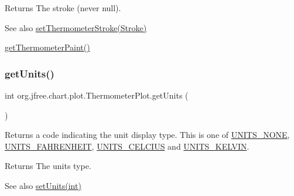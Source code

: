 \begin{DoxyReturn}{Returns}
The stroke (never {\ttfamily null}).
\end{DoxyReturn}
\begin{DoxySeeAlso}{See also}
\mbox{\hyperlink{classorg_1_1jfree_1_1chart_1_1plot_1_1_thermometer_plot_aaa2d0470bf85ee2eee9ea9e7568d919b}{set\+Thermometer\+Stroke(\+Stroke)}} 

\mbox{\hyperlink{classorg_1_1jfree_1_1chart_1_1plot_1_1_thermometer_plot_ac725954b0973477c957c51b0e359fcda}{get\+Thermometer\+Paint()}} 
\end{DoxySeeAlso}
\mbox{\label{classorg_1_1jfree_1_1chart_1_1plot_1_1_thermometer_plot_a69a0570b65093596ac626a988a3bcdbf}} 
\subsubsection{\texorpdfstring{get\+Units()}{getUnits()}}
{\footnotesize\ttfamily int org.\+jfree.\+chart.\+plot.\+Thermometer\+Plot.\+get\+Units (\begin{DoxyParamCaption}{ }\end{DoxyParamCaption})}

Returns a code indicating the unit display type. This is one of \mbox{\hyperlink{classorg_1_1jfree_1_1chart_1_1plot_1_1_thermometer_plot_ac84457e7f6d847ecf1659f2387f1e7be}{U\+N\+I\+T\+S\+\_\+\+N\+O\+NE}}, \mbox{\hyperlink{classorg_1_1jfree_1_1chart_1_1plot_1_1_thermometer_plot_a4000e1bd40b62e1159c32e7b90e92e56}{U\+N\+I\+T\+S\+\_\+\+F\+A\+H\+R\+E\+N\+H\+E\+IT}}, \mbox{\hyperlink{classorg_1_1jfree_1_1chart_1_1plot_1_1_thermometer_plot_aaac36a74e11fa57e77581d5cc03896b4}{U\+N\+I\+T\+S\+\_\+\+C\+E\+L\+C\+I\+US}} and \mbox{\hyperlink{classorg_1_1jfree_1_1chart_1_1plot_1_1_thermometer_plot_a3eaea529d20d3035dd08e0aa9a985c75}{U\+N\+I\+T\+S\+\_\+\+K\+E\+L\+V\+IN}}.

\begin{DoxyReturn}{Returns}
The units type.
\end{DoxyReturn}
\begin{DoxySeeAlso}{See also}
\mbox{\hyperlink{classorg_1_1jfree_1_1chart_1_1plot_1_1_thermometer_plot_a854875ffe9c0e66313089d022effdd44}{set\+Units(int)}} 
\end{DoxySeeAlso}
\mbox{\label{classorg_1_1jfree_1_1chart_1_1plot_1_1_thermometer_plot_a075c87a92b66a6895c411e1c674670fe}} 
